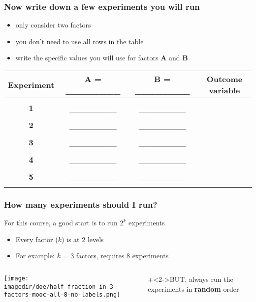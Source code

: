 \begin{frame}\frametitle{Now write down a few experiments you will run}
	\begin{itemize}
		\item	only consider two factors
		\item	you don't need to use all rows in the table
		\item	write the specific values you will use for factors \textbf{A} and \textbf{B}
	\end{itemize}
	
	\vspace{1cm}
	\begin{tabulary}{\linewidth}{c|c|c|c}
		\textbf{\relax Experiment} & \textbf{\relax A = \_\_\_\_\_\_\_\_} & \textbf{\relax B = \_\_\_\_\_\_\_\_} & \textbf{\relax Outcome variable } \\ \hline &  &  & \\
		\textbf{1} & \_\_\_\_\_\_\_\_  & \_\_\_\_\_\_\_\_ &   \\ &  &  & \\
		\textbf{2} & \_\_\_\_\_\_\_\_  & \_\_\_\_\_\_\_\_ &   \\ &  &  & \\
		\textbf{3} & \_\_\_\_\_\_\_\_  & \_\_\_\_\_\_\_\_ &   \\ &  &  & \\
		\textbf{4} & \_\_\_\_\_\_\_\_  & \_\_\_\_\_\_\_\_ &   \\ &  &  & \\
		\textbf{5} & \_\_\_\_\_\_\_\_  & \_\_\_\_\_\_\_\_ &   \\ &  &  & \\
	\end{tabulary}	
\end{frame}

\begin{frame}\frametitle{How many experiments should I run?}
	For this course, a good start is to run $2^k$ experiments
	\begin{itemize}
		\item	Every factor ($k$) is at 2 levels
		\item	For example: $k$ = 3 factors, requires 8 experiments
	\end{itemize}
	
	
	
	\begin{columns}[c]
			\centerline{\texttt{[image: \\imagedir/doe/half-fraction-in-3-factors-mooc-all-8-no-labels.png]}}
			\onslide+<2->{{\color{red}BUT, always run the experiments in \textbf{random} order}}

	\end{columns}
	
\end{frame}

